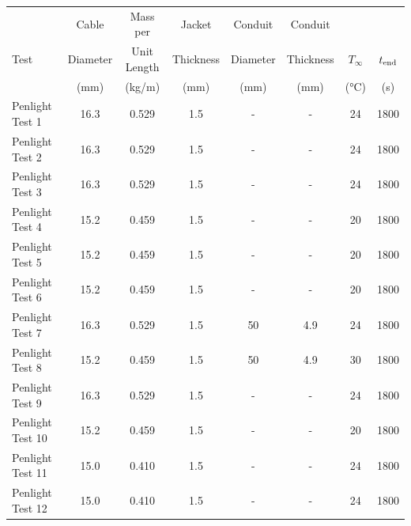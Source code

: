 \begin{table}[!ht]
\begin{center}
\begin{tabular}{|l|c|c|c|c|c|c|c|}
\hline
                  &  Cable     &  Mass per     &  Jacket     &  Conduit   &  Conduit    &                   &               \\
Test              &  Diameter  &  Unit Length  &  Thickness  &  Diameter  &  Thickness  &  $T_\infty$       &  $t_{\rm end}$  \\
                  &  (mm)      &  (kg/m)       &  (mm)       &  (mm)      &  (mm)       &  (\si{\celsius})  &  (s)          \\ \hline \hline
Penlight Test 1   &  16.3      &  0.529        &  1.5        &  -         &  -          &  24               &  1800         \\ \hline
Penlight Test 2   &  16.3      &  0.529        &  1.5        &  -         &  -          &  24               &  1800         \\ \hline
Penlight Test 3   &  16.3      &  0.529        &  1.5        &  -         &  -          &  24               &  1800         \\ \hline
Penlight Test 4   &  15.2      &  0.459        &  1.5        &  -         &  -          &  20               &  1800         \\ \hline
Penlight Test 5   &  15.2      &  0.459        &  1.5        &  -         &  -          &  20               &  1800         \\ \hline
Penlight Test 6   &  15.2      &  0.459        &  1.5        &  -         &  -          &  20               &  1800         \\ \hline
Penlight Test 7   &  16.3      &  0.529        &  1.5        &  50        &  4.9        &  24               &  1800         \\ \hline
Penlight Test 8   &  15.2      &  0.459        &  1.5        &  50        &  4.9        &  30               &  1800         \\ \hline
Penlight Test 9   &  16.3      &  0.529        &  1.5        &  -         &  -          &  24               &  1800         \\ \hline
Penlight Test 10  &  15.2      &  0.459        &  1.5        &  -         &  -          &  20               &  1800         \\ \hline
Penlight Test 11  &  15.0      &  0.410        &  1.5        &  -         &  -          &  24               &  1800         \\ \hline
Penlight Test 12  &  15.0      &  0.410        &  1.5        &  -         &  -          &  24               &  1800         \\ \hline

\end{tabular}
\end{center}
\end{table}
